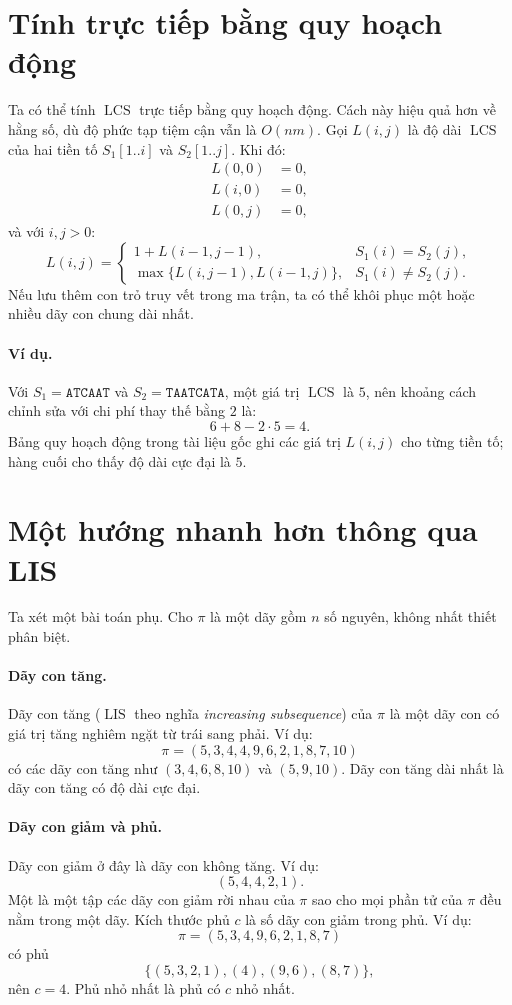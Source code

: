 \documentclass[11pt]{article}
\newcommand{\LCS}{\operatorname{LCS}}
\newcommand{\LIS}{\operatorname{LIS}}
\begin{document}
\section{Tính trực tiếp bằng quy hoạch động}

Ta có thể tính \(\LCS\) trực tiếp bằng quy hoạch động. Cách này hiệu quả hơn
về hằng số, dù độ phức tạp tiệm cận vẫn là \(O(nm)\). Gọi \(L(i,j)\) là độ
dài \(\LCS\) của hai tiền tố \(S_1[1..i]\) và \(S_2[1..j]\). Khi đó:
\[
\begin{aligned}
L(0,0)&=0,\\
L(i,0)&=0,\\
L(0,j)&=0,
\end{aligned}
\]
và với \(i,j>0\):
\[
L(i,j)=
\begin{cases}
1+L(i-1,j-1), & S_1(i)=S_2(j),\\
\max\{L(i,j-1),L(i-1,j)\}, & S_1(i)\ne S_2(j).
\end{cases}
\]
Nếu lưu thêm con trỏ truy vết trong ma trận, ta có thể khôi phục một hoặc
nhiều dãy con chung dài nhất.

\paragraph{Ví dụ.}
Với \(S_1=\texttt{ATCAAT}\) và \(S_2=\texttt{TAATCATA}\), một giá trị
\(\LCS\) là \(5\), nên khoảng cách chỉnh sửa với chi phí thay thế bằng \(2\)
là:
\[
  6+8-2\cdot5=4.
\]
Bảng quy hoạch động trong tài liệu gốc ghi các giá trị \(L(i,j)\) cho từng
tiền tố; hàng cuối cho thấy độ dài cực đại là \(5\).

\section{Một hướng nhanh hơn thông qua LIS}

Ta xét một bài toán phụ. Cho \(\pi\) là một dãy gồm \(n\) số nguyên, không
nhất thiết phân biệt.

\paragraph{Dãy con tăng.}
Dãy con tăng (\(\LIS\) theo nghĩa \textit{increasing subsequence}) của
\(\pi\) là một dãy con có giá trị tăng nghiêm ngặt từ trái sang phải. Ví dụ:
\[
  \pi=(5,3,4,4,9,6,2,1,8,7,10)
\]
có các dãy con tăng như \((3,4,6,8,10)\) và \((5,9,10)\). Dãy con tăng dài
nhất là dãy con tăng có độ dài cực đại.

\paragraph{Dãy con giảm và phủ.}
Dãy con giảm ở đây là dãy con không tăng. Ví dụ:
\[
  (5,4,4,2,1).
\]
Một  là một tập các dãy con giảm rời nhau của \(\pi\) sao cho mọi
phần tử của \(\pi\) đều nằm trong một dãy. Kích thước phủ \(c\) là số dãy con
giảm trong phủ. Ví dụ:
\[
\pi=(5,3,4,9,6,2,1,8,7)
\]
có phủ
\[
\{(5,3,2,1),(4),(9,6),(8,7)\},
\]
nên \(c=4\). Phủ nhỏ nhất là phủ có \(c\) nhỏ nhất.
\end{document}
